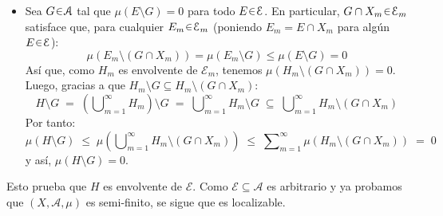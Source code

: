 \begin{sol}
\begin{itemize}[leftmargin=1em]
\[\;=\; \bigcup\nolimits^\infty_{m=1}(E \cap X_m)\setminus H
\;\subseteq\; \bigcup\nolimits^\infty_{m=1}(E\cap X_m)\setminus H_m
\]
De esto se sigue que
\[
\mu(E\setminus H) 
\;\leq\; \mu\left(\bigcup\nolimits^\infty_{m=1}(E\cap X_m)\setminus H_m\right)
\;\leq\; \sum\nolimits^\infty_{m=1}\mu\bigl((E\cap X_m)\setminus H_m\bigr)
\;=\;0
\]
y así, $\mu(E\setminus H) = 0$.
\item Sea $G \en\mathcal{A}$ tal que $\mu(E\setminus G) = 0$ para todo $E\en\mathcal{E}$. En particular, $G\cap X_m \en \mathcal{E}_m$ satisface que, para cualquier $E_m \en \mathcal{E}_m$ (poniendo $E_m = E \cap X_m$ para algún $E\en\mathcal{E}$):
\[
\mu(E_m \setminus(G\cap X_m)) = \mu(E_m\setminus G )\leq \mu(E\setminus G) = 0
\]
Así que, como $H_m$ es envolvente de $\mathcal{E}_m$, tenemos $\mu(H_m\setminus(G\cap X_m)) = 0$. Luego, gracias a que $H_m \setminus G \subseteq H_m\setminus(G\cap X_m)$:
\[
H\setminus G  
\;=\; \left(\bigcup\nolimits^\infty_{m=1}H_m\right)\setminus G
\;=\; \bigcup\nolimits^\infty_{m=1}H_m\setminus G
\;\subseteq\; \bigcup\nolimits^\infty_{m=1}H_m\setminus (G\cap X_m)
\]
Por tanto:
\[
\mu(H\setminus G) 
\;\leq\; \mu\left(\bigcup\nolimits^\infty_{m=1}H_m\setminus (G\cap X_m)\right)
\;\leq\; \sum\nolimits^\infty_{m=1}\mu(H_m\setminus (G\cap X_m))
\;=\; 0
\]
y así, $\mu(H\setminus G) = 0$.
\end{itemize}
Esto prueba que $H$ es envolvente de $\mathcal{E}$. Como $\mathcal{E}\subseteq \mathcal{A}$ es arbitrario y ya probamos que $(X, \mathcal{A}, \mu)$ es semi-finito, se sigue que es localizable.
\end{sol}